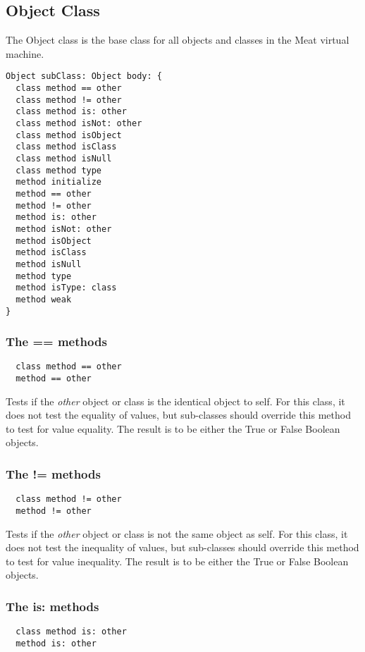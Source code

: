 \subsection {Object Class}

The Object class is the base class for all objects and classes in the
Meat virtual machine.

\begin{lstlisting}
Object subClass: Object body: {
  class method == other
  class method != other
  class method is: other
  class method isNot: other
  class method isObject
  class method isClass
  class method isNull
  class method type
  method initialize
  method == other
  method != other
  method is: other
  method isNot: other
  method isObject
  method isClass
  method isNull
  method type
  method isType: class
  method weak
}
\end{lstlisting}

\subsubsection {The == methods}
\begin{lstlisting}
  class method == other
  method == other
\end{lstlisting}

Tests if the \textit{other} object or class is the identical object
to self. For this class, it does not test the equality of values, but
sub-classes should override this method to test for value equality. The
result is to be either the True or False Boolean objects.

\hfill
\subsubsection {The != methods}
\begin{lstlisting}
  class method != other
  method != other
\end{lstlisting}

Tests if the \textit{other} object or class is not the same object
as self. For this class, it does not test the inequality of values, but
sub-classes should override this method to test for value inequality. The
result is to be either the True or False Boolean objects.

\hfill
\subsubsection {The is: methods}
\begin{lstlisting}
  class method is: other
  method is: other
\end{lstlisting}


